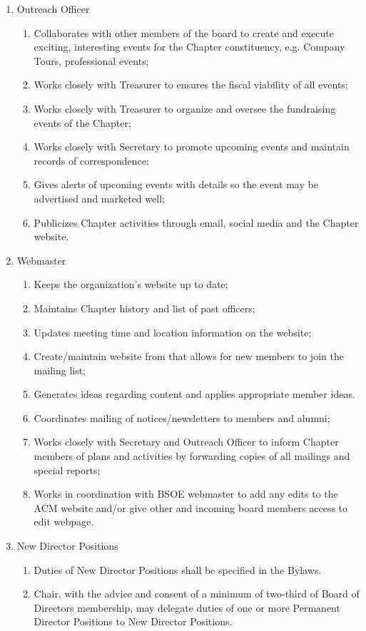 \begin{enumerate}
	\item Outreach Officer
	\begin{enumerate}
		\item Collaborates with other members of the board to create and execute exciting, interesting events for the Chapter constituency, e.g. Company Tours, professional events;
		\item Works closely with Treasurer to ensures the fiscal viability of all events;
		\item Works closely with Treasurer to organize and oversee the fundraising events of the Chapter;
		\item Works closely with Secretary to promote upcoming events and maintain records of correspondence;
		\item Gives alerts of upcoming events with details so the event may be advertised and marketed well;
		\item Publicizes Chapter activities through email, social media and the Chapter website.
	\end{enumerate}
	\item Webmaster
	\begin{enumerate}
		\item Keeps the organization’s website up to date;
		\item Maintains Chapter history and list of past officers;
		\item Updates meeting time and location information on the website;
		\item Create/maintain website from that allows for new members to join the mailing list;
		\item Generates ideas regarding content and applies appropriate member ideas.
		\item Coordinates mailing of notices/newsletters to members and alumni;
		\item Works closely with Secretary and Outreach Officer to inform Chapter members of plans and activities by forwarding copies of all mailings and special reports;
		\item Works in coordination with BSOE webmaster to add any edits to the ACM website and/or give other and incoming board members access to edit webpage.
	\end{enumerate}
	\item New Director Positions
	\begin{enumerate}
		\item Duties of New Director Positions shall be specified in the Bylaws.
		\item Chair, with the advice and consent of a minimum of two-third of Board of Directors membership, may delegate duties of one or more Permanent Director Positions to New Director Positions.

\end{enumerate}
\end{enumerate}
